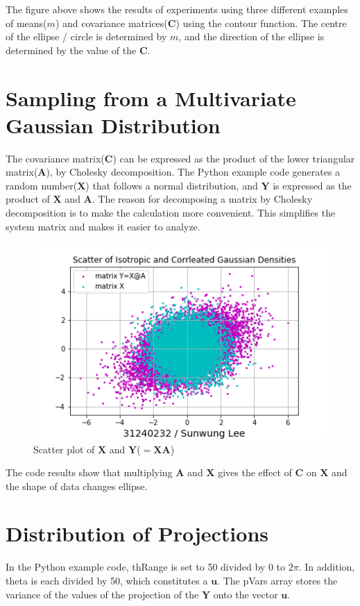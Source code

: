 \documentclass[letterpaper, 11pt]{article}
\renewcommand{\vec}[1]{\boldsymbol{\mathbf{#1}}}
\newcommand{\mat}[1]{\vec{#1}}
\begin{document}
\noindent The figure above shows the results of experiments using three different examples of means($m$) and covariance matrices($\mat{C}$) using the contour function.
The centre of the ellipse / circle is determined by $m$, and the direction of the ellipse is determined by the value of the $\mat{C}$.

\section{Sampling from a Multivariate Gaussian Distribution}
The covariance matrix($\mat{C}$) can be expressed as the product of the lower triangular matrix($\mat{A}$), by Cholesky decomposition.
The Python example code generates a random number($\mat{X}$) that follows a normal distribution, and $\mat{Y}$ is expressed as the product of $\mat{X}$ and $\mat{A}$.
The reason for decomposing a matrix by Cholesky decomposition is to make the calculation more convenient. This simplifies the system matrix and makes it easier to analyze.

\begin{figure}[h] %

\begin{center}

\includegraphics[width=0.5\linewidth]{5_Sampling_from_a_Multivariate_Gaussian_Distribution.png}
\caption{Scatter plot of $\mat{X}$ and $\mat{Y}$($=\mat{X}\mat{A}$)}
\end{center}
\end{figure}
The code results show that multiplying $\mat{A}$ and $\mat{X}$ gives the effect of $\mat{C}$ on $\mat{X}$ and the shape of data changes ellipse.

\section{Distribution of Projections}

In the Python example code, thRange is set to 50 divided by 0 to $2\pi$. In addition, theta is each divided by 50, which constitutes a $\mat{u}$. The pVars array stores the variance of the values of the projection of the $\mat{Y}$ onto the vector $\mat{u}$.
\end{document}
